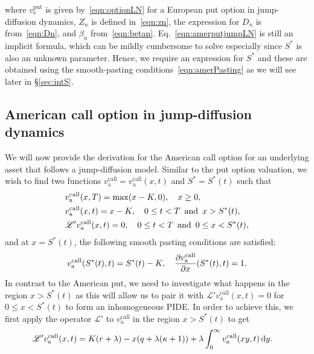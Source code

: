 		where $v_{\text{e}}^{\text{put}}$ is given by~\eqref{eqn:optionLN} for a European put option in jump-diffusion dynamics, $Z_n$ is defined in~\eqref{eqn:zn}, the expression for $D_n$ is from~\eqref{eqn:Dn}, and $\beta_n$ from~\eqref{eqn:betan}. Eq.~\eqref{eqn:amerputjumpLN} is still an implicit formula, which can be mildly cumbersome to solve especially since $S^*$ is also an unknown parameter. Hence, we require an expression for $S^*$ and these are obtained using the smooth-pasting conditions~\eqref{eqn:amerPasting} as we will see later in \S \ref{sec:intS}.
		
		\subsection{American call option in jump-diffusion dynamics}
		We will now provide the derivation for the American call option for an underlying asset that follows a jump-diffusion model. Similar to the put option valuation, we wish to find two functions $v_{\text{a}}^{\text{call}} = v_{\text{a}}^{\text{call}}(x,t)$ and $S^* = S^*(t)$ such that
		\begin{equation}
        \label{eqn:amercallPIDE}
        \begin{split}
            &v_{\text{a}}^{\text{call}}(x,T) = \max(x-K,0), \quad x \geq 0, \\
            &v_{\text{a}}^{\text{call}}(x,t) = x-K, \quad 0 \leq t < T \enskip \text{and} \enskip x > S^*(t), \\
            &\mathscr{L'}v_{\text{a}}^{\text{call}}(x,t) = 0, \quad 0 \leq t < T \enskip \text{and} \enskip 0 \leq x < S^*(t),
        \end{split}
    \end{equation}
    and at $x = S^*(t)$, the following smooth pasting conditions are satisfied:
    	\begin{equation}
    		\label{eqn:amercallPIDEsmc}
    		v_{\text{a}}^{\text{call}}(S^*(t),t) = S^*(t) - K, \quad \frac{\partial v_{\text{a}}^{\text{call}}}{\partial x}(S^*(t),t) = 1.
    	\end{equation}
	In contrast to the American put, we need to investigate what happens in the region $x > S^*(t)$ as this will allow us to pair it with $\mathscr{L'}v_{\text{a}}^{\text{call}}(x,t) = 0$ for $0 \leq x < S^*(t)$ to form an inhomogeneous PIDE. In order to achieve this, we first apply the operator $\mathscr{L'}$ to $v_{\text{a}}^{\text{call}}$ in the region $x > S^*(t)$ to get
		 \begin{align*}
            \mathscr L'v_{\text{a}}^{\text{call}}(x,t) &=  K(r+\lambda) - x(q + \lambda(\kappa+1)) + \lambda\int_0^\infty v_{\text{a}}^{\text{call}}(xy,t) \, \mathrm d y.
        \end{align*}
